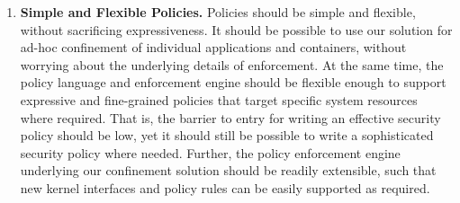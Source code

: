\begin{enumerate}[font=\bfseries]
  \item \label{i:dg-simplicity} \textbf{Simple and Flexible Policies.}
    Policies should be simple and flexible, without sacrificing expressiveness. It should
    be possible to use our solution for ad-hoc confinement of individual
    applications and containers, without worrying about the underlying details of
    enforcement. At the same time, the policy language and enforcement engine should be
    flexible enough to support expressive and fine-grained policies that target specific
    system resources where required. That is, the barrier to entry for writing an
    effective security policy should be low, yet it should still be possible to write
    a sophisticated security policy where needed. Further, the policy enforcement engine
    underlying our confinement solution should be readily extensible, such that new
    kernel interfaces and policy rules can be easily supported as required.




\end{enumerate}
